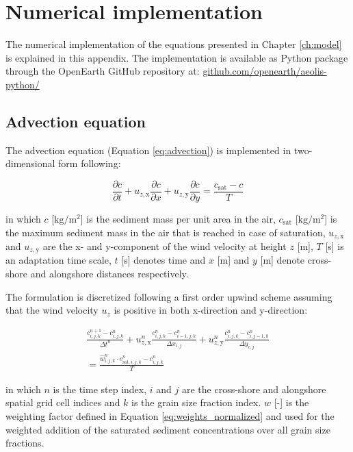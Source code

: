 \chapter{Numerical implementation}
\label{apx:numerics}

The numerical implementation of the equations presented in Chapter
\ref{ch:model} is explained in this appendix.  The implementation is
available as Python package through the OpenEarth GitHub repository
at:
\href{http://www.github.com/openearth/aeolis-python/}{github.com/openearth/aeolis-python/}

\section{Advection equation}

The advection equation (Equation \ref{eq:advection}) is implemented in
two-dimensional form following:

\begin{equation}
  \label{eq:apx_advection}
  \frac{\partial c}{\partial t} +
  u_{z,\mathrm{x}} \frac{\partial c}{\partial x} + 
  u_{z,\mathrm{y}} \frac{\partial c}{\partial y} = 
  \frac{c_{\mathrm{sat}} - c}{T}
\end{equation}

\noindent in which $c$ [$\mathrm{kg/m^2}$] is the sediment mass per
unit area in the air, $c_{\mathrm{sat}}$ [$\mathrm{kg/m^2}$] is the
maximum sediment mass in the air that is reached in case of
saturation, $u_{z,\mathrm{x}}$ and $u_{z,\mathrm{y}}$ are the x- and
y-component of the wind velocity at height $z$ [m], $T$ [s] is an
adaptation time scale, $t$ [s] denotes time and $x$ [m] and $y$ [m]
denote cross-shore and alongshore distances respectively.

The formulation is discretized following a first order upwind scheme
assuming that the wind velocity $u_z$ is positive in both
x-direction and y-direction:

\begin{multline}
  \label{eq:apx_explicit}
  \frac{c^{n+1}_{i,j,k} - c^n_{i,j,k}}{\Delta t^n} + 
  u^n_{z,\mathrm{x}} \frac{c^n_{i,j,k} - c^n_{i-1,j,k}}{\Delta x_{i,j}} + 
  u^n_{z,\mathrm{y}} \frac{c^n_{i,j,k} - c^n_{i,j-1,k}}{\Delta y_{i,j}} \\ = 
  \frac{\hat{w}^n_{i,j,k} \cdot c^n_{\mathrm{sat},i,j,k} - c^n_{i,j,k}}{T}
\end{multline}

\noindent in which $n$ is the time step index, $i$ and $j$ are the
cross-shore and alongshore spatial grid cell indices and $k$ is the
grain size fraction index. $w$ [-] is the weighting factor defined in
Equation \ref{eq:weights_normalized} and used for the weighted
addition of the saturated sediment concentrations over all grain size
fractions.

